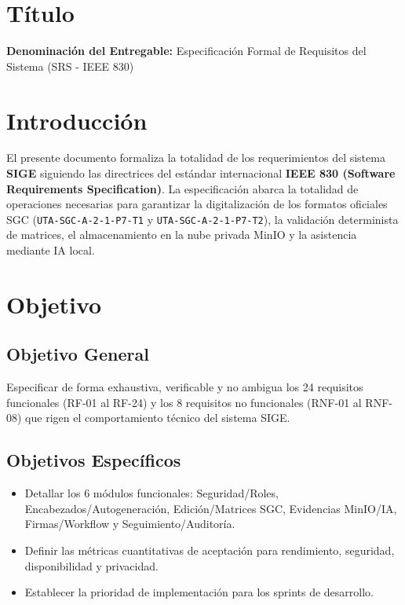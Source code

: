 \documentclass[12pt,a4paper]{article}
\begin{document}

\vspace{0.25cm}
\section{Título}
\textbf{Denominación del Entregable:} Especificación Formal de Requisitos del Sistema (SRS - IEEE 830)



\section{Introducción}
El presente documento formaliza la totalidad de los requerimientos del sistema \textbf{SIGE} siguiendo las directrices del estándar internacional \textbf{IEEE 830 (Software Requirements Specification)}. La especificación abarca la totalidad de operaciones necesarias para garantizar la digitalización de los formatos oficiales SGC (\texttt{UTA-SGC-A-2-1-P7-T1} y \texttt{UTA-SGC-A-2-1-P7-T2}), la validación determinista de matrices, el almacenamiento en la nube privada MinIO y la asistencia mediante IA local.

\section{Objetivo}

\subsection{Objetivo General}
Especificar de forma exhaustiva, verificable y no ambigua los 24 requisitos funcionales (RF-01 al RF-24) y los 8 requisitos no funcionales (RNF-01 al RNF-08) que rigen el comportamiento técnico del sistema SIGE.

\subsection{Objetivos Específicos}
\begin{itemize}[leftmargin=1.5em, itemsep=1.5pt, topsep=1.5pt]
    \item Detallar los 6 módulos funcionales: Seguridad/Roles, Encabezados/Autogeneración, Edición/Matrices SGC, Evidencias MinIO/IA, Firmas/Workflow y Seguimiento/Auditoría.
    \item Definir las métricas cuantitativas de aceptación para rendimiento, seguridad, disponibilidad y privacidad.
    \item Establecer la prioridad de implementación para los sprints de desarrollo.
\end{itemize}
\end{document}

